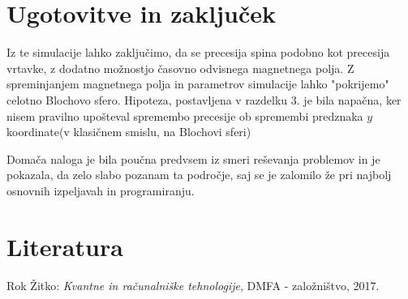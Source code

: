 \documentclass[12pt, a4paper]{article}
\begin{document}
\section{Ugotovitve in zaključek}
Iz te simulacije lahko zaključimo, da se precesija spina podobno kot precesija vrtavke, z dodatno možnostjo časovno odvisnega magnetnega polja. Z spreminjanjem magnetnega polja in parametrov simulacije lahko "pokrijemo" celotno Blochovo sfero. Hipoteza, postavljena v razdelku 3. je bila napačna, ker nisem pravilno upošteval spremembo precesije ob spremembi predznaka $y$ koordinate(v klasičnem smislu, na Blochovi sferi)

Domača naloga je bila poučna predvsem iz smeri reševanja problemov in je pokazala, da zelo slabo pozanam ta področje, saj se je zalomilo že pri najbolj osnovnih izpeljavah in programiranju.

\section{Literatura}
Rok Žitko: \textit{Kvantne in računalniške tehnologije}, DMFA - založništvo, 2017.
\end{document}
